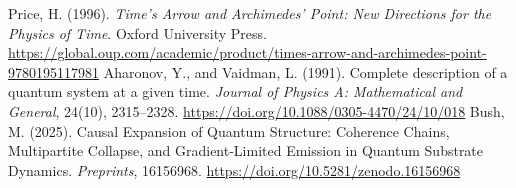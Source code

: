 \documentclass[preprints,article,submit,pdftex,moreauthors]{Definitions/mdpi}
\begin{document}
{\begin{thebibliography}{999}
Price, H. (1996). \textit{Time's Arrow and Archimedes’ Point: New Directions for the Physics of Time}. Oxford University Press. \url{https://global.oup.com/academic/product/times-arrow-and-archimedes-point-9780195117981}
Aharonov, Y., and Vaidman, L. (1991). Complete description of a quantum system at a given time. \textit{Journal of Physics A: Mathematical and General}, 24(10), 2315–2328. \url{https://doi.org/10.1088/0305-4470/24/10/018}
Bush, M. (2025). Causal Expansion of Quantum Structure: Coherence Chains, Multipartite Collapse, and Gradient-Limited Emission in Quantum Substrate Dynamics. \textit{Preprints}, 16156968. 
\url{https://doi.org/10.5281/zenodo.16156968}

\end{thebibliography}
}



%
\end{document}
